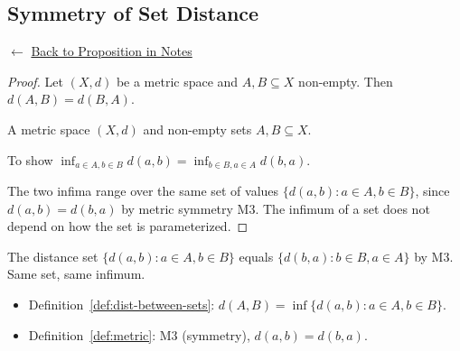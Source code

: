 
\subsection*{Symmetry of Set Distance}
\label{prf:dist-sets-symmetric}

\begin{remark*}[Return]
$\leftarrow$ \hyperref[prop:dist-sets-symmetric]{Back to Proposition in Notes}
\end{remark*}

\begin{proof}
\Claim Let $(X,d)$ be a metric space and $A, B \subseteq X$ non-empty.
Then $d(A, B) = d(B, A)$.

\Given A metric space $(X,d)$ and non-empty sets $A, B \subseteq X$.

\Goal To show $\inf_{a \in A, b \in B} d(a,b) = \inf_{b \in B, a \in A} d(b,a)$.

\Strategy The two infima range over the same set of values
$\{d(a,b) : a \in A, b \in B\}$,
since $d(a,b) = d(b,a)$ by metric symmetry M3.
The infimum of a set does not depend on how the set is parameterized.


\end{proof}

\begin{remark*}
The distance set $\{d(a,b) : a \in A, b \in B\}$ equals
$\{d(b,a) : b \in B, a \in A\}$ by M3. Same set, same infimum.
\end{remark*}

\begin{remark*}[Dependencies]
\begin{itemize}
  \item Definition~\ref{def:dist-between-sets}: $d(A,B) = \inf\{d(a,b) : a \in A, b \in B\}$.
  \item Definition~\ref{def:metric}: M3 (symmetry), $d(a,b) = d(b,a)$.
\end{itemize}
\end{remark*}
